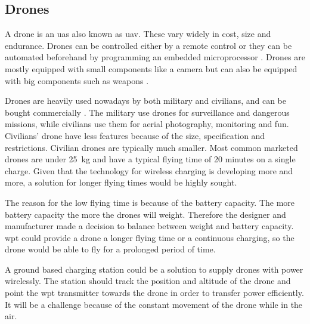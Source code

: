 \subsection{Drones} \label{sec:app_drones}
A drone is an \gls{uas} also known as \gls{uav}. These vary widely in cost, size and endurance. Drones can be controlled either by a remote control or they can be automated beforehand by programming an embedded microprocessor \citep{TechReport:UAV}. Drones are mostly equipped with small components like a camera but can also be equipped with big components such as weapons \citep{Web:Mili}.

Drones are heavily used nowadays by both military and civilians, and can be bought commercially \citep{Web:Drone}. The military use drones for surveillance and dangerous missions, while civilians use them for aerial photography, monitoring and fun. Civilians' drone have less features because of the size, specification and restrictions. Civilian drones are typically much smaller. Most common marketed drones are under \SI{25}{\kilogram} and have a typical flying time of 20 minutes on a single charge. Given that the technology for wireless charging is developing more and more, a solution for longer flying times would be highly sought.

The reason for the low flying time is because of the battery capacity. The more battery capacity the more the drones will weight. Therefore the designer and manufacturer made a decision to balance between weight and battery capacity. \gls{wpt} could provide a drone a longer flying time or a continuous charging, so the drone would be able to fly for a prolonged period of time.

A ground based charging station could be a solution to supply drones with power wirelessly. The station should track the position and altitude of the drone and point the \gls{wpt} transmitter towards the drone in order to transfer power efficiently. It will be a challenge because of the constant movement of the drone while in the air. %
